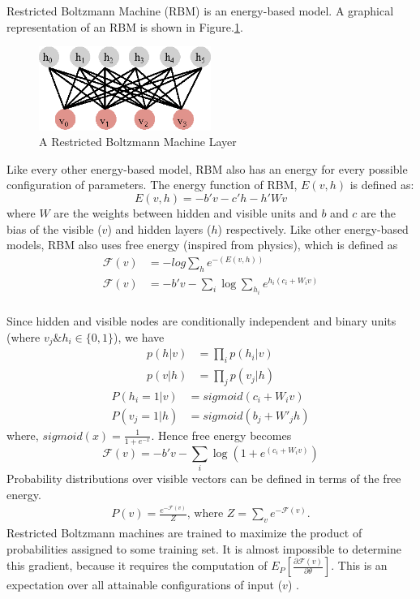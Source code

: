 Restricted Boltzmann Machine (RBM) is an energy-based model.  A graphical representation of an RBM is shown in Figure.\ref{fig:rbm_layer}.

\begin{figure}[!ht]
  \centering
  \includegraphics[width=0.5\textwidth]{./imgs/rbm.eps}
  \caption{A Restricted Boltzmann Machine Layer}
  \label{fig:rbm_layer}
\end{figure}%

Like every other energy-based model, RBM also has an energy for every possible configuration of parameters.  The energy function of RBM, $E(v,h)$ is defined as: 
$$E(v,h) = - b'v - c'h - h'Wv$$
where $W$ are the weights between hidden and visible units and $b$ and $c$ are the bias of the visible ($v$) and hidden layers ($h$) respectively.  Like other energy-based models, RBM also uses free energy (inspired from physics), which is defined as
\begin{align*}
\mathcal{F}(v) &= -log \sum_{h}{e^{-(E(v,h))}} \\
\mathcal{F}(v) &= - b'v - \sum_i \log \sum_{h_i} e^{h_i (c_i + W_i v)}\\
\end{align*}

Since hidden and visible nodes are conditionally independent and binary units (where $v_j \& h_i \in \{0,1\}$), we have 
\begin{align}
p(h|v) &= \prod_i p(h_i|v) \\
p(v|h) &= \prod_j p(v_j|h) 
\end{align}
\begin{align}
P(h_i=1|v) &= sigmoid(c_i + W_i v) \label{eq:rbm_layers_prob1} \\
P(v_j=1|h) &= sigmoid(b_j + W'_j h) \label{eq:rbm_layers_prob2}
\end{align}
where, $sigmoid(x)= \frac{1}{1 + e^{-x}}$. Hence free energy becomes
$$\mathcal{F}(v)= - b'v - \sum_i \log(1 + e^{(c_i + W_i v)})$$ %
Probability distributions over visible vectors can be defined in terms of the free energy.
\begin{align*}
P(v) = \frac{e^{-\mathcal{F}(v)}}{Z} \text{, where } Z=\sum_v e^{-\mathcal{F}(v)}.
\end{align*}
Restricted Boltzmann machines are trained to maximize the product of probabilities assigned to some training set.  It is almost impossible to determine this gradient, because it requires the computation of $E_P[\frac{\partial \mathcal{F}(v)} {\partial \theta} ]$.  This is an expectation over all attainable configurations of input ($v$) \cite{hinton2010practical}.

